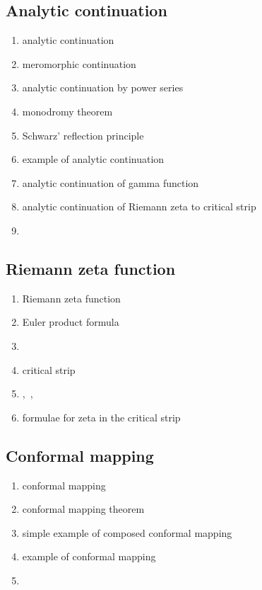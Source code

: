 \documentclass[12pt]{article}
\theoremstyle{definition}
\begin{document}
\subsection{Analytic continuation}
\begin{enumerate}
\item analytic continuation
\item meromorphic continuation
\item analytic continuation by power series
\item monodromy theorem
\item Schwarz' reflection principle
\item example of analytic continuation
\item analytic continuation of gamma function
\item analytic continuation of Riemann zeta to critical strip
\item {}
\end{enumerate}

\subsection{Riemann zeta function}
\begin{enumerate}
\item Riemann zeta function
\item Euler product formula
\item {}
\item critical strip
\item {},\, 
,\, 
\item formulae for zeta in the critical strip
\end{enumerate}

\subsection{Conformal mapping}
\begin{enumerate}
\item conformal mapping
\item conformal mapping theorem
\item simple example of composed conformal mapping
\item example of conformal mapping
\item {}
\end{enumerate}
\end{document}
